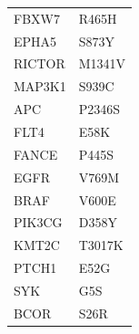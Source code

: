 \documentclass[12pt,a4paper]{article}\usepackage[]{graphicx}\usepackage[]{color}
\begin{document}
\begin{longtable}{ll}
  FBXW7 & R465H \\ 
  EPHA5 & S873Y \\ 
  RICTOR & M1341V \\ 
  MAP3K1 & S939C \\ 
  APC & P2346S \\ 
  FLT4 & E58K \\ 
  FANCE & P445S \\ 
  EGFR & V769M \\ 
  BRAF & V600E \\ 
  PIK3CG & D358Y \\ 
  KMT2C & T3017K \\ 
  PTCH1 & E52G \\ 
  SYK & G5S \\ 
  BCOR & S26R \\ 
   \hline
\hline
\end{longtable}
\endgroup

\clearpage
\end{document}
